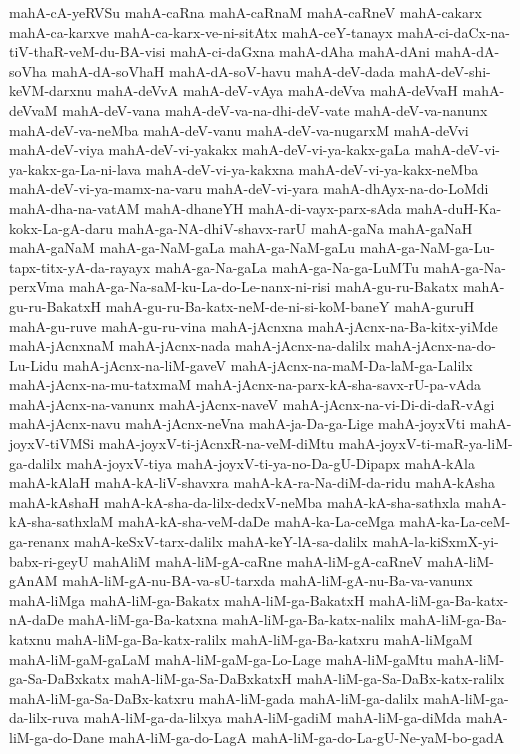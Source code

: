 {mahA-cA-yeRVSu
mahA-caRna
mahA-caRnaM
mahA-caRneV
mahA-cakarx
mahA-ca-karxve
mahA-ca-karx-ve-ni-sitAtx
mahA-ceY-tanayx
mahA-ci-daCx-na-tiV-thaR-veM-du-BA-visi
mahA-ci-daGxna
mahA-dAha
mahA-dAni
mahA-dA-soVha
mahA-dA-soVhaH
mahA-dA-soV-havu
mahA-deV-dada
mahA-deV-shi-keVM-darxnu
mahA-deVvA
mahA-deV-vAya
mahA-deVva
mahA-deVvaH
mahA-deVvaM
mahA-deV-vana
mahA-deV-va-na-dhi-deV-vate
mahA-deV-va-nanunx
mahA-deV-va-neMba
mahA-deV-vanu
mahA-deV-va-nugarxM
mahA-deVvi
mahA-deV-viya
mahA-deV-vi-yakakx
mahA-deV-vi-ya-kakx-gaLa
mahA-deV-vi-ya-kakx-ga-La-ni-lava
mahA-deV-vi-ya-kakxna
mahA-deV-vi-ya-kakx-neMba
mahA-deV-vi-ya-mamx-na-varu
mahA-deV-vi-yara
mahA-dhAyx-na-do-LoMdi
mahA-dha-na-vatAM
mahA-dhaneYH
mahA-di-vayx-parx-sAda
mahA-duH-Ka-kokx-La-gA-daru
mahA-ga-NA-dhiV-shavx-rarU
mahA-gaNa
mahA-gaNaH
mahA-gaNaM
mahA-ga-NaM-gaLa
mahA-ga-NaM-gaLu
mahA-ga-NaM-ga-Lu-tapx-titx-yA-da-rayayx
mahA-ga-Na-gaLa
mahA-ga-Na-ga-LuMTu
mahA-ga-Na-perxVma
mahA-ga-Na-saM-ku-La-do-Le-nanx-ni-risi
mahA-gu-ru-Bakatx
mahA-gu-ru-BakatxH
mahA-gu-ru-Ba-katx-neM-de-ni-si-koM-baneY
mahA-guruH
mahA-gu-ruve
mahA-gu-ru-vina
mahA-jAcnxna
mahA-jAcnx-na-Ba-kitx-yiMde
mahA-jAcnxnaM
mahA-jAcnx-nada
mahA-jAcnx-na-dalilx
mahA-jAcnx-na-do-Lu-Lidu
mahA-jAcnx-na-liM-gaveV
mahA-jAcnx-na-maM-Da-laM-ga-Lalilx
mahA-jAcnx-na-mu-tatxmaM
mahA-jAcnx-na-parx-kA-sha-savx-rU-pa-vAda
mahA-jAcnx-na-vanunx
mahA-jAcnx-naveV
mahA-jAcnx-na-vi-Di-di-daR-vAgi
mahA-jAcnx-navu
mahA-jAcnx-neVna
mahA-ja-Da-ga-Lige
mahA-joyxVti
mahA-joyxV-tiVMSi
mahA-joyxV-ti-jAcnxR-na-veM-diMtu
mahA-joyxV-ti-maR-ya-liM-ga-dalilx
mahA-joyxV-tiya
mahA-joyxV-ti-ya-no-Da-gU-Dipapx
mahA-kAla
mahA-kAlaH
mahA-kA-liV-shavxra
mahA-kA-ra-Na-diM-da-ridu
mahA-kAsha
mahA-kAshaH
mahA-kA-sha-da-lilx-dedxV-neMba
mahA-kA-sha-sathxla
mahA-kA-sha-sathxlaM
mahA-kA-sha-veM-daDe
mahA-ka-La-ceMga
mahA-ka-La-ceM-ga-renanx
mahA-keSxV-tarx-dalilx
mahA-keY-lA-sa-dalilx
mahA-la-kiSxmX-yi-babx-ri-geyU
mahAliM
mahA-liM-gA-caRne
mahA-liM-gA-caRneV
mahA-liM-gAnAM
mahA-liM-gA-nu-BA-va-sU-tarxda
mahA-liM-gA-nu-Ba-va-vanunx
mahA-liMga
mahA-liM-ga-Bakatx
mahA-liM-ga-BakatxH
mahA-liM-ga-Ba-katx-nA-daDe
mahA-liM-ga-Ba-katxna
mahA-liM-ga-Ba-katx-nalilx
mahA-liM-ga-Ba-katxnu
mahA-liM-ga-Ba-katx-ralilx
mahA-liM-ga-Ba-katxru
mahA-liMgaM
mahA-liM-gaM-gaLaM
mahA-liM-gaM-ga-Lo-Lage
mahA-liM-gaMtu
mahA-liM-ga-Sa-DaBxkatx
mahA-liM-ga-Sa-DaBxkatxH
mahA-liM-ga-Sa-DaBx-katx-ralilx
mahA-liM-ga-Sa-DaBx-katxru
mahA-liM-gada
mahA-liM-ga-dalilx
mahA-liM-ga-da-lilx-ruva
mahA-liM-ga-da-lilxya
mahA-liM-gadiM
mahA-liM-ga-diMda
mahA-liM-ga-do-Dane
mahA-liM-ga-do-LagA
mahA-liM-ga-do-La-gU-Ne-yaM-bo-gadA
}

